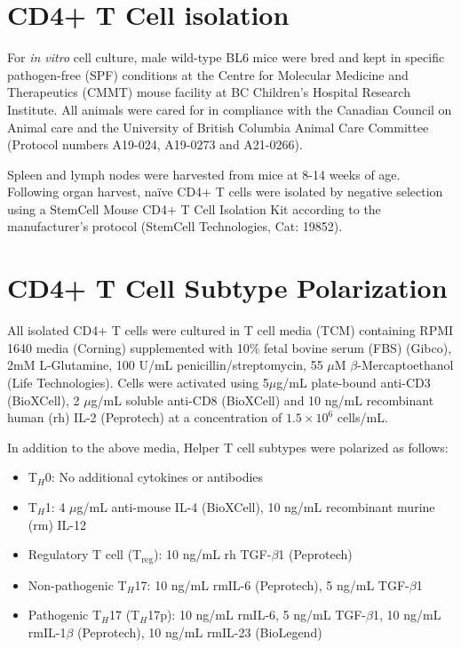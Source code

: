 \section{CD4+ T Cell isolation}
\label{cha:cd4diff}
For \textit{in vitro} cell culture, male wild-type BL6 mice were bred and kept in specific pathogen-free (SPF) conditions at the Centre for Molecular Medicine and Therapeutics (CMMT) mouse facility at BC Children's Hospital Research Institute. All animals were cared for in compliance with the Canadian Council on Animal care and the University of British Columbia Animal Care Committee (Protocol numbers A19-024, A19-0273 and A21-0266). 

Spleen and lymph nodes were harvested from mice at 8-14 weeks of age. Following organ harvest, naïve CD4+ T cells were isolated by negative selection using a StemCell Mouse CD4+ T Cell Isolation Kit according to the manufacturer's protocol (StemCell Technologies, Cat: 19852). 

\section{CD4+ T Cell Subtype Polarization}
All isolated CD4+ T cells were cultured in T cell media (TCM) containing RPMI 1640 media (Corning) supplemented with 10\% fetal bovine serum (FBS) (Gibco), 2mM L-Glutamine, 100 U/mL penicillin/streptomycin, 55 $\mu$M $\beta$-Mercaptoethanol (Life Technologies). Cells were activated using 5$\mu$g/mL plate-bound anti-CD3 (BioXCell), 2 $\mu$g/mL soluble anti-CD8 (BioXCell) and 10 ng/mL recombinant human (rh) IL-2 (Peprotech) at a concentration of $1.5 \times 10^6$ cells/mL. 

In addition to the above media, Helper T cell subtypes were polarized as follows: 
\begin{itemize}
    \item T$_H$0: No additional cytokines or antibodies
    \item T$_H$1: 4 $\mu$g/mL anti-mouse IL-4 (BioXCell), 10 ng/mL recombinant murine (rm) IL-12
    \item Regulatory T cell (T$_\text{reg}$): 10 ng/mL rh TGF-$\beta$1 (Peprotech)
    \item Non-pathogenic T$_H$17: 10 ng/mL rmIL-6 (Peprotech), 5 ng/mL TGF-$\beta$1
    \item Pathogenic T$_H$17 (T$_H$17p): 10 ng/mL rmIL-6, 5 ng/mL TGF-$\beta$1, 10 ng/mL rmIL-1$\beta$ (Peprotech), 10 ng/mL rmIL-23 (BioLegend)
\end{itemize}

